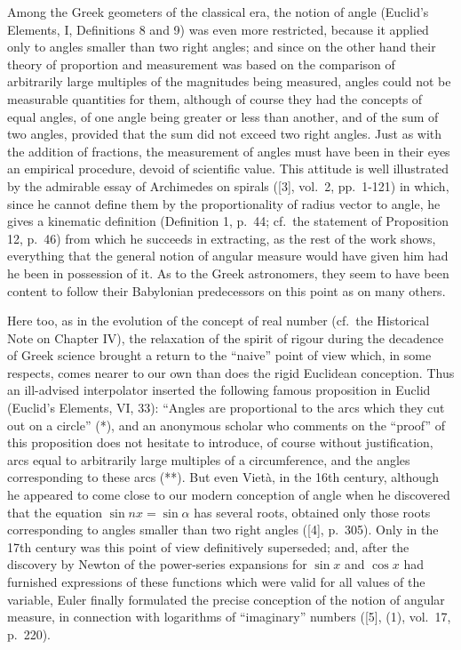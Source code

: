 Among the Greek geometers of the classical era, the notion of angle (Euclid's Elements, I, Definitions 8 and 9) was even more restricted, because it applied only to angles smaller than two right angles; and since on the other hand their theory of proportion and measurement was based on the comparison of arbitrarily large multiples of the magnitudes being measured, angles could not be measurable quantities for them, although of course they had the concepts of equal angles, of one angle being greater or less than another, and of the sum of two angles, provided that the sum did not exceed two right angles. Just as with the addition of fractions, the measurement of angles must have been in their eyes an empirical procedure, devoid of scientific value. This attitude is well illustrated by the admirable essay of Archimedes on spirals ({[}3{]}, vol.~2, pp.~1-121) in which, since he cannot define them by the proportionality of radius vector to angle, he gives a kinematic definition (Definition 1, p.~44; cf.~the statement of Proposition 12, p.~46) from which he succeeds in extracting, as the rest of the work shows, everything that the general notion of angular measure would have given him had he been in possession of it. As to the Greek astronomers, they seem to have been content to follow their Babylonian predecessors on this point as on many others.

Here too, as in the evolution of the concept of real number (cf.~the Historical Note on Chapter IV), the relaxation of the spirit of rigour during the decadence of Greek science brought a return to the ``naive'' point of view which, in some respects, comes nearer to our own than does the rigid Euclidean conception. Thus an ill-advised interpolator inserted the following famous proposition in Euclid (Euclid's Elements, VI, 33): ``Angles are proportional to the arcs which they cut out on a circle'' (*), and an anonymous scholar who comments on the ``proof'' of this proposition does not hesitate to introduce, of course without justification, arcs equal to arbitrarily large multiples of a circumference, and the angles corresponding to these arcs (**). But even Vietà, in the 16th century, although he appeared to come close to our modern conception of angle when he discovered that the equation \(\sin nx = \sin \alpha\) has several roots, obtained only those roots corresponding to angles smaller than two right angles ({[}4{]}, p.~305). Only in the 17th century was this point of view definitively superseded; and, after the discovery by Newton of the power-series expansions for \(\sin x\) and \(\cos x\) had furnished expressions of these functions which were valid for all values of the variable, Euler finally formulated the precise conception of the notion of angular measure, in connection with logarithms of ``imaginary'' numbers ({[}5{]}, (1), vol.~17, p.~220).


